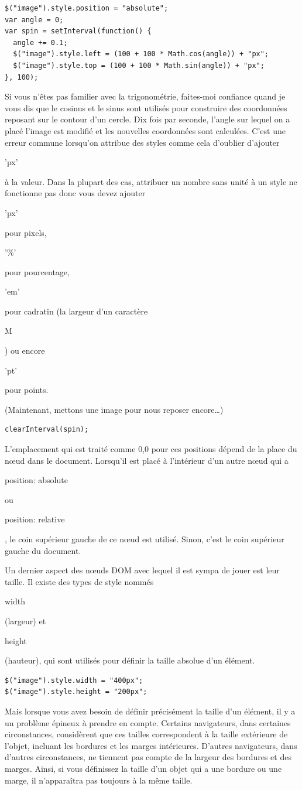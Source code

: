 \documentclass{FramateX}
\renewcommand{\texttt}[1]{\begin{sffamily}{#1}\end{sffamily}}
\begin{document}
\begin{lstlisting}
$("image").style.position = "absolute";
var angle = 0;
var spin = setInterval(function() {
  angle += 0.1;
  $("image").style.left = (100 + 100 * Math.cos(angle)) + "px";
  $("image").style.top = (100 + 100 * Math.sin(angle)) + "px";
}, 100);
\end{lstlisting}
Si vous n'êtes pas familier avec la trigonométrie, faites-moi confiance
quand je vous dis que le cosinus et le sinus sont utilisés pour
construire des coordonnées reposant sur le contour d'un cercle. Dix fois
par seconde, l'angle sur lequel on a placé l'image est modifié et les
nouvelles coordonnées sont calculées. C'est une erreur commune lorsqu'on
attribue des styles comme cela d'oublier d'ajouter \texttt{'px'} à la
valeur. Dans la plupart des cas, attribuer un nombre sans unité à un
style ne fonctionne pas donc vous devez ajouter \texttt{'px'} pour
pixels, \texttt{'\%'} pour pourcentage, \texttt{'em'} pour cadratin (la
largeur d'un caractère \texttt{M}) ou encore \texttt{'pt'} pour points.

(Maintenant, mettons une image pour nous reposer encore\ldots{})

\begin{lstlisting}
clearInterval(spin);
\end{lstlisting}
L'emplacement qui est traité comme 0,0 pour ces positions dépend de la
place du nœud dans le document. Lorsqu'il est placé à l'intérieur d'un
autre nœud qui a \texttt{position: absolute} ou
\texttt{position: relative}, le coin supérieur gauche de ce nœud est
utilisé. Sinon, c'est le coin supérieur gauche du document.

\begin{center}\end{center}

Un dernier aspect des nœuds DOM avec lequel il est sympa de jouer est
leur taille. Il existe des types de style nommés \texttt{width}
(largeur) et \texttt{height} (hauteur), qui sont utilisés pour définir
la taille absolue d'un élément.

\begin{lstlisting}
$("image").style.width = "400px";
$("image").style.height = "200px";
\end{lstlisting}
Mais lorsque vous avez besoin de définir précisément la taille d'un
élément, il y a un problème épineux à prendre en compte. Certains
navigateurs, dans certaines circonstances, considèrent que ces tailles
correspondent à la taille extérieure de l'objet, incluant les bordures
et les marges intérieures. D'autres navigateurs, dans d'autres
circonstances, ne tiennent pas compte de la largeur des bordures et des
marges. Ainsi, si vous définissez la taille d'un objet qui a une bordure
ou une marge, il n'apparaîtra pas toujours à la même taille.
\end{document}
